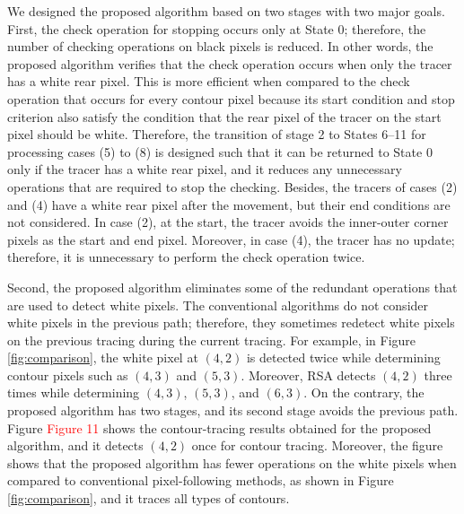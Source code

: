 We designed the proposed algorithm based on two stages with two major goals. First, the check operation for stopping occurs only at State 0; therefore, the number of checking operations on black pixels is reduced. In other words, the proposed algorithm verifies that the check operation occurs when only the tracer has a white rear pixel. This is more efficient when compared to the check operation that occurs for every contour pixel because its start condition and stop criterion also satisfy the condition that the rear pixel of the tracer on the start pixel should be white. Therefore, the transition of stage 2 to States 6–11 for processing cases (5) to (8) is designed such that it can be returned to State 0 only if the tracer has a white rear pixel, and it reduces any unnecessary operations that are required to stop the checking. Besides, the tracers of cases (2) and (4) have a white rear pixel after the movement, but their end conditions are not considered. In case (2), at the start, the tracer avoids the inner-outer corner pixels as the start and end pixel. Moreover, in case (4), the tracer has no update; therefore, it is unnecessary to perform the check operation twice. 


Second, the proposed algorithm eliminates some of the redundant operations that are used to detect white pixels. The conventional algorithms do not consider white pixels in the previous path; therefore, they sometimes redetect white pixels on the previous tracing during the current tracing. For example, in Figure \ref{fig:comparison}, the white pixel at $(4, 2)$ is detected twice while determining contour pixels such as $(4, 3)$ and $(5, 3)$. Moreover, RSA detects $(4, 2)$ three times while determining $(4, 3)$, $(5, 3)$, and $(6, 3)$. On the contrary, the proposed algorithm has two stages, and its second stage avoids the previous path. Figure \textcolor{red}{Figure 11} shows the contour-tracing results obtained for the proposed algorithm, and it detects $(4, 2)$ once for contour tracing. Moreover, the figure shows that the proposed algorithm has fewer operations on the white pixels when compared to conventional pixel-following methods, as shown in Figure \ref{fig:comparison}, and it traces all types of contours. 

